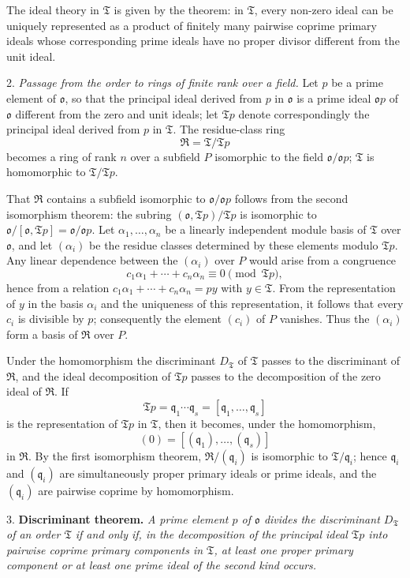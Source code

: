 \documentclass[11pt]{article}
\providecommand{\mR}{\mathfrak{R}}
\providecommand{\mT}{\mathfrak{T}}
\providecommand{\mo}{\mathfrak{o}}
\providecommand{\mq}{\mathfrak{q}}
\begin{document}
The ideal theory in $\mT$ is given by the theorem: in $\mT$, every non-zero ideal can be uniquely represented as a product of finitely many pairwise coprime primary ideals whose corresponding prime ideals have no proper divisor different from the unit ideal.

2. \emph{Passage from the order to rings of finite rank over a field.} Let $p$ be a prime element of $\mo$, so that the principal ideal derived from $p$ in $\mo$ is a prime ideal $\mo p$ of $\mo$ different from the zero and unit ideals; let $\mT p$ denote correspondingly the principal ideal derived from $p$ in $\mT$. The residue-class ring
\[
        \mR=\mT/\mT p
\]
becomes a ring of rank $n$ over a subfield $P$ isomorphic to the field $\mo/\mo p$; $\mT$ is homomorphic to $\mT/\mT p$.

That $\mR$ contains a subfield isomorphic to $\mo/\mo p$ follows from the second isomorphism theorem: the subring $(\mo,\mT p)/\mT p$ is isomorphic to $\mo/[\mo,\mT p]=\mo/\mo p$. Let $\alpha_1,\ldots,\alpha_n$ be a linearly independent module basis of $\mT$ over $\mo$, and let $(\alpha_i)$ be the residue classes determined by these elements modulo $\mT p$. Any linear dependence between the $(\alpha_i)$ over $P$ would arise from a congruence
\[
        c_1\alpha_1+\cdots+c_n\alpha_n\equiv0\pmod{\mT p},
\]
hence from a relation $c_1\alpha_1+\cdots+c_n\alpha_n=py$ with $y\in\mT$. From the representation of $y$ in the basis $\alpha_i$ and the uniqueness of this representation, it follows that every $c_i$ is divisible by $p$; consequently the element $(c_i)$ of $P$ vanishes. Thus the $(\alpha_i)$ form a basis of $\mR$ over $P$.

Under the homomorphism the discriminant $D_\mT$ of $\mT$ passes to the discriminant of $\mR$, and the ideal decomposition of $\mT p$ passes to the decomposition of the zero ideal of $\mR$. If
\[
        \mT p=\mq_1\cdots\mq_s=[\mq_1,\ldots,\mq_s]
\]
is the representation of $\mT p$ in $\mT$, then it becomes, under the homomorphism,
\[
        (0)=[(\mq_1),\ldots,(\mq_s)]
\]
in $\mR$. By the first isomorphism theorem, $\mR/(\mq_i)$ is isomorphic to $\mT/\mq_i$; hence $\mq_i$ and $(\mq_i)$ are simultaneously proper primary ideals or prime ideals, and the $(\mq_i)$ are pairwise coprime by homomorphism.

3. \textbf{Discriminant theorem.} \emph{A prime element $p$ of $\mo$ divides the discriminant $D_\mT$ of an order $\mT$ if and only if, in the decomposition of the principal ideal $\mT p$ into pairwise coprime primary components in $\mT$, at least one proper primary component or at least one prime ideal of the second kind occurs.}
\end{document}
